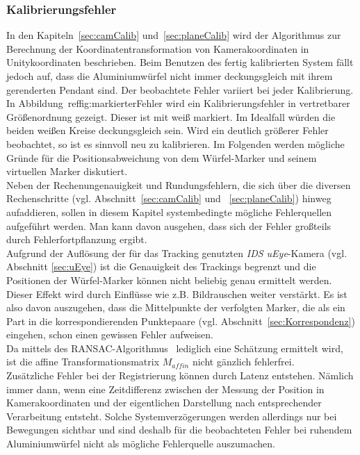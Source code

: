 \subsubsection{Kalibrierungsfehler} \label{sec:calibError}
In den Kapiteln~\ref{sec:camCalib} und~\ref{sec:planeCalib} wird der Algorithmus zur Berechnung der Koordinatentransformation von Kamerakoordinaten in Unitykoordinaten beschrieben. Beim Benutzen des fertig kalibrierten System fällt jedoch auf, dass die Aluminiumwürfel nicht immer deckungsgleich mit ihrem gerenderten Pendant sind. Der beobachtete Fehler variiert bei jeder Kalibrierung. In Abbildung~ref{fig:markierterFehler} wird ein Kalibrierungsfehler in vertretbarer Größenordnung gezeigt. Dieser ist mit weiß markiert. Im Idealfall würden die beiden weißen Kreise deckungsgleich sein. Wird ein deutlich größerer Fehler beobachtet, so ist es sinnvoll neu zu kalibrieren. Im Folgenden werden mögliche Gründe für die Positionsabweichung von dem Würfel-Marker und seinem virtuellen Marker diskutiert. \\
Neben der Rechenungenauigkeit und Rundungsfehlern, die sich über die diversen Rechenschritte (vgl. Abschnitt~\ref{sec:camCalib} und ~\ref{sec:planeCalib}) hinweg aufaddieren, sollen in diesem Kapitel systembedingte mögliche Fehlerquellen aufgeführt werden. Man kann davon ausgehen, dass sich der Fehler großteils durch Fehlerfortpflanzung \cite{schmalstieg2016augmented} ergibt.\\ 
Aufgrund der Auflösung der für das Tracking genutzten \textit{IDS uEye}-Kamera (vgl. Abschnitt \ref{sec:uEye}) ist die Genauigkeit des Trackings begrenzt und die Positionen der Würfel-Marker können nicht beliebig genau ermittelt werden. Dieser Effekt wird durch Einflüsse wie z.B. Bildrauschen weiter verstärkt. Es ist also davon auszugehen, dass die Mittelpunkte der verfolgten Marker, die als ein Part in die korrespondierenden Punktepaare (vgl. Abschnitt~\ref{sec:Korrespondenz}) eingehen, schon einen gewissen Fehler aufweisen. \\
Da mittels des RANSAC-Algorithmus~\cite{articel:RANSAC} lediglich eine Schätzung ermittelt wird, ist die affine Transformationsmatrix $M_{affin}$ nicht gänzlich fehlerfrei. \\
Zusätzliche Fehler bei der Registrierung können durch Latenz entstehen. Nämlich immer dann, wenn eine Zeitdifferenz zwischen der Messung der Position in Kamerakoordinaten und der eigentlichen Darstellung nach entsprechender
Verarbeitung entsteht. Solche Systemverzögerungen werden allerdings nur bei Bewegungen sichtbar und sind deshalb für die beobachteten Fehler bei ruhendem Aluminiumwürfel nicht als mögliche Fehlerquelle auszumachen. 

